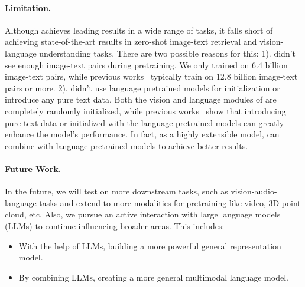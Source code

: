 \paragraph{Limitation.}
Although \onepeace achieves leading results in a wide range of tasks, it falls short of achieving state-of-the-art results in zero-shot image-text retrieval and vision-language understanding tasks.
There are two possible reasons for this:
1). \onepeace didn't see enough image-text pairs during pretraining. We only trained on 6.4 billion image-text pairs, while previous works~\cite{clip,align,coca} typically train on 12.8 billion image-text pairs or more.
2). \onepeace didn't use language pretrained models for initialization or introduce any pure text data. Both the vision and language modules of \onepeace are completely randomly initialized, while previous works~\cite{ofa,blip2} show that introducing pure text data or initialized with the language pretrained models can greatly enhance the model's performance. 
In fact, as a highly extensible model, \onepeace can combine with language pretrained models to achieve better results.

\paragraph{Future Work.}
In the future, we will test \onepeace on more downstream tasks, such as vision-audio-language tasks and extend to more modalities for pretraining like video, 3D point cloud, etc.
Also, we pursue an active interaction with large language models (LLMs) to continue influencing broader areas. This includes:

\begin{itemize}
    \item With the help of LLMs, building a more powerful general representation model.
    \item By combining LLMs, creating a more general multimodal language model.
\end{itemize}